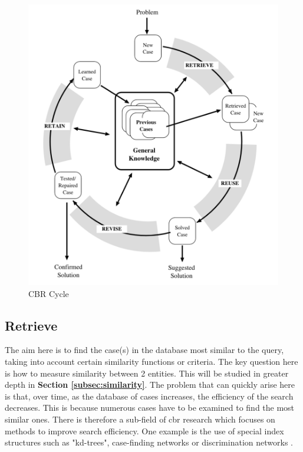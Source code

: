     \begin{figure}[h]
    \centering
    \includegraphics[scale=0.6]{images/Concept-cbr-cycle.png}
    \caption{\label{fig:cbr-cycle}  CBR Cycle \cite{cbrIntroRecent}}
    \end{figure}
    

    \subsection{Retrieve}
    The aim here is to find the case(s) in the database most similar to the query, taking into account certain similarity functions or criteria. The key question here is how to measure similarity between 2 entities. This will be studied in greater depth in \textbf{Section \ref{subsec:similarity}}. The problem that can quickly arise here is that, over time, as the database of cases increases, the efficiency of the search decreases. This is because numerous cases have to be examined to find the most similar ones. There is therefore a sub-field of \acrshort{cbr} research which focuses on methods to improve search efficiency. One example is the use of special index structures such as "kd-trees", case-finding networks or discrimination networks \cite{cbrIntroRecent}.
    
